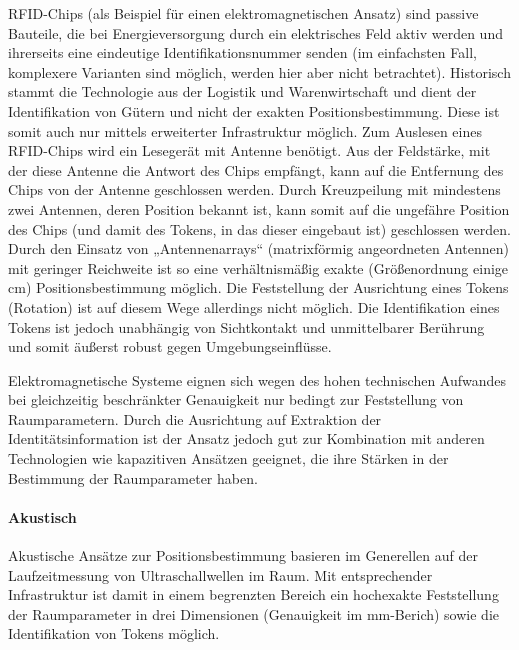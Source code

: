 RFID-Chips (als Beispiel für einen elektromagnetischen Ansatz) sind passive Bauteile, die bei Energieversorgung durch ein elektrisches Feld aktiv werden und ihrerseits eine eindeutige Identifikationsnummer senden (im einfachsten Fall, komplexere Varianten sind möglich, werden hier aber nicht betrachtet). Historisch stammt die Technologie aus der Logistik und Warenwirtschaft und dient der Identifikation von Gütern und nicht der exakten Positionsbestimmung. Diese ist somit auch nur mittels erweiterter Infrastruktur möglich. Zum Auslesen eines RFID-Chips wird ein Lesegerät mit Antenne benötigt. Aus der Feldstärke, mit der diese Antenne die Antwort des Chips empfängt, kann auf die Entfernung des Chips von der Antenne geschlossen werden. Durch Kreuzpeilung mit mindestens zwei Antennen, deren Position bekannt ist, kann somit auf die ungefähre Position des Chips (und damit des Tokens, in das dieser eingebaut ist) geschlossen werden. Durch den Einsatz von „Antennenarrays“ (matrixförmig angeordneten Antennen) mit geringer Reichweite ist so eine verhältnismäßig exakte (Größenordnung einige cm) Positionsbestimmung möglich. Die Feststellung der Ausrichtung eines Tokens (Rotation) ist auf diesem Wege allerdings nicht möglich. Die Identifikation eines Tokens ist jedoch unabhängig von Sichtkontakt und unmittelbarer Berührung und somit äußerst robust gegen Umgebungseinflüsse.

Elektromagnetische Systeme eignen sich wegen des hohen technischen Aufwandes bei gleichzeitig beschränkter Genauigkeit nur bedingt zur Feststellung von Raumparametern. Durch die Ausrichtung auf Extraktion der Identitätsinformation ist der Ansatz jedoch gut zur Kombination mit anderen Technologien wie kapazitiven Ansätzen geeignet, die ihre Stärken in der Bestimmung der Raumparameter haben.
 

\paragraph{Akustisch} %
\label{par:akustisch}

Akustische Ansätze zur Positionsbestimmung basieren im Generellen auf der Laufzeitmessung von Ultraschallwellen im Raum. Mit entsprechender Infrastruktur ist damit in einem begrenzten Bereich ein hochexakte Feststellung der Raumparameter in drei Dimensionen (Genauigkeit im mm-Berich) sowie die Identifikation von Tokens möglich.

